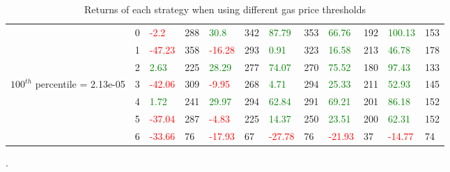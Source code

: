 \begin{table}[htb!]
\begin{adjustwidth}{-0.9in}{-0.9in}
\begin{tabular}{|p{5em}|p{2em}|p{3em}|p{3em}|p{3em}|p{3em}|p{3em}|p{3em}|p{3em}|p{3em}|p{3em}|p{3em}|}
            & 0 & \textcolor{red}{-2.2} & 288 & \textcolor{green}{30.8} & 342 & \textcolor{green}{87.79} & 353 & \textcolor{green}{66.76} & 192 & \textcolor{green}{100.13} & 153\\\cline{3-12}
            & 1 & \textcolor{red}{-47.23} & 358 & \textcolor{red}{-16.28} & 293 & \textcolor{green}{0.91} & 323 & \textcolor{green}{16.58} & 213 & \textcolor{green}{46.78} & 178\\\cline{3-12}
            & 2 & \textcolor{green}{2.63} & 225 & \textcolor{green}{28.29} & 277 & \textcolor{green}{74.07} & 270 & \textcolor{green}{75.52} & 180 & \textcolor{green}{97.43} & 133\\\cline{3-12}
            $100^{th}$ percentile = 2.13e-05 & 3 & \textcolor{red}{-42.06} & 309 & \textcolor{red}{-9.95} & 268 & \textcolor{green}{4.71} & 294 & \textcolor{green}{25.33} & 211 & \textcolor{green}{52.93} & 145\\[-5.5ex]\cline{3-12}
            & 4 & \textcolor{green}{1.72} & 241 & \textcolor{green}{29.97} & 294 & \textcolor{green}{62.84} & 291 & \textcolor{green}{69.21} & 201 & \textcolor{green}{86.18} & 152\\\cline{3-12}
            & 5 & \textcolor{red}{-37.04} & 287 & \textcolor{red}{-4.83} & 225 & \textcolor{green}{14.37} & 250 & \textcolor{green}{23.51} & 200 & \textcolor{green}{62.31} & 152\\\cline{3-12}
            & 6 & \textcolor{red}{-33.66} & 76 & \textcolor{red}{-17.93} & 67 & \textcolor{red}{-27.78} & 76 & \textcolor{red}{-21.93} & 37 & \textcolor{red}{-14.77} & 74\\\hline
        \end{tabular}
    \end{adjustwidth}
    \caption{Returns of each strategy when using different gas price thresholds \label{tab:VaryGasPriceThresholds}}.
\end{table}

